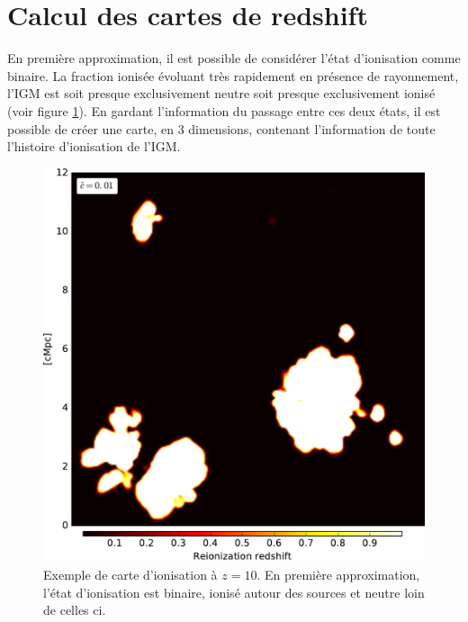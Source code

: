 

\section{Calcul des cartes de redshift}
\label{sec:zmapcompute}

En première approximation, il est possible de considérer l'état d'ionisation comme binaire.
La fraction ionisée évoluant très rapidement en présence de rayonnement, l'\ac{IGM} est soit presque exclusivement neutre soit presque exclusivement ionisé (voir figure \ref{fig:xionmap}). %
En gardant l'information du passage entre ces deux états, il est possible de créer une carte, en 3 dimensions, contenant l’information de toute l'histoire d'ionisation de l'\ac{IGM}.


\begin{figure}
        \includegraphics[width=.95\linewidth]{img/04_mapreio/xion_map.pdf} 
        \caption[Carte d'ionisation]{Exemple de carte d'ionisation à $z=10$.
        En première approximation, l'état d'ionisation est binaire, ionisé autour des sources et neutre loin de celles ci.
 		\label{fig:xionmap}}
\end{figure}

